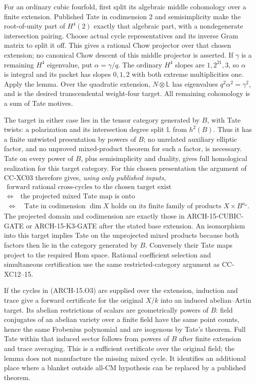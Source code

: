 For an ordinary cubic fourfold, first split its algebraic middle
cohomology over a finite extension. Published Tate in codimension 2
and semisimplicity make the root-of-unity part of \(H^4(2)\) exactly
that algebraic part, with a nondegenerate intersection pairing. Choose
actual cycle representatives and its inverse Gram matrix to split it
off. This gives a rational Chow projector over that chosen extension;
no canonical Chow descent of this middle projector is asserted.
If \(\gamma\) is a remaining \(H^4\) eigenvalue, put
\(\alpha=\gamma/q\). The ordinary \(H^4\) slopes are
\(1,2^{21},3\), so \(\alpha\) is integral and its packet has slopes
\(0,1,2\) with both extreme multiplicities one. Apply the lemma.
Over the quadratic extension, \(N\otimes\mathbb L\) has eigenvalues
\(q^2\alpha^2=\gamma^2\), and is the desired transcendental
weight-four target. All remaining cohomology is a sum of Tate motives.

The target in either case lies in the tensor category generated by
\(B\), with Tate twists: a polarization and its intersection degree
split \(\mathbb L\) from \(h^2(B)\). Thus it has a finite untwisted
presentation by powers of \(B\); no unrelated auxiliary elliptic
factor, and no unproved mixed-product theorem for such a factor, is
necessary. Tate on every power of \(B\), plus semisimplicity and
duality, gives full homological realization for this target category.
For this chosen presentation the argument of CC-XC03 therefore gives,
\emph{using only published inputs},
\[
 \begin{gathered}
 \text{forward rational cross-cycles to the chosen target exist}\\
 \Longleftrightarrow\quad
 \text{the projected mixed Tate map is onto}\\
 \Longleftrightarrow\quad
 \text{Tate in codimension \(\dim X\) holds on its finite family
 of products \(X\times B^{n_\nu}\)}.
 \end{gathered}
 \tag{ARCH-15.O3}
\]
The projected domain and codimension are exactly those in
ARCH-15-CUBIC-GATE or ARCH-15-K3-GATE after the stated base extension.
An isomorphism into this target implies Tate on the unprojected mixed
products because both factors then lie in the category generated by
\(B\). Conversely their Tate maps project to the required Hom space.
Rational coefficient selection and simultaneous certification use the
same restricted-category argument as CC-XC12--15.

If the cycles in (ARCH-15.O3) are supplied over the extension, induction
and trace give a forward certificate for the original \(X/k\) into
an induced abelian--Artin target. Its abelian restrictions of scalars
are geometrically powers of \(B\): field conjugates of an abelian
variety over a finite field have the same point counts, hence the same
Frobenius polynomial and are isogenous by Tate's theorem. Full Tate
within that induced sector follows from powers of \(B\) after finite
extension and trace averaging. This is a sufficient certificate over
the original field; the lemma does not manufacture the missing mixed
cycle. It identifies an additional place where a blanket outside
all-CM hypothesis can be replaced by a published theorem.
